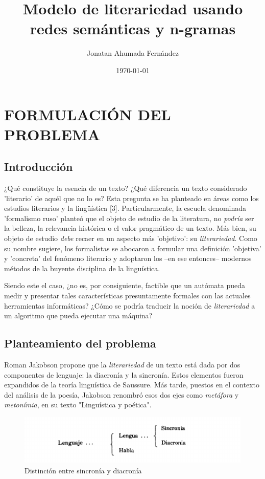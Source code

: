 \documentclass[twoside]{article}
\author{Jonatan Ahumada Fernández}
\date{\today}
\title{Modelo de literariedad usando redes semánticas y n-gramas}
\begin{document}
\maketitle
\tableofcontents

\section{FORMULACIÓN DEL PROBLEMA}
\label{sec:org73fd18f}
\subsection{Introducción}
\label{sec:org29c4680}

¿Qué constituye la esencia de un texto? ¿Qué diferencia un texto
considerado 'literario' de aquél que no lo es? Esta pregunta se ha
planteado en áreas como los estudios literarios y la lingüística
[3]. Particularmente, la escuela denominada 'formalismo ruso' planteó
que el objeto de estudio de la literatura, no \emph{podría} ser la belleza, la
relevancia histórica o el valor pragmático de un texto. Más
bien, su objeto de estudio \emph{debe} recaer en un aspecto más 'objetivo':
su \emph{literariedad}.  Como su nombre sugiere, los formalistas se
abocaron a formular una definición 'objetiva' y 'concreta' del
fenómeno literario y adoptaron los --en ese entonces-- modernos
métodos de la buyente disciplina de la linguística.

Siendo este el caso, ¿no es, por consiguiente, factible que un
autómata pueda medir y presentar tales características presuntamente
formales con las actuales herramientas informáticas? ¿Cómo se podría
traducir la noción de \emph{literariedad} a un algoritmo que pueda ejecutar
una máquina?


\subsection{Planteamiento del problema}
\label{sec:org25a0a33}
Roman Jakobson propone que la \emph{literariedad} de un texto está dada por
dos componentes de lenguaje: la diacronía y la sincronía. Estos
elementos fueron expandidos de la teoría linguística de Saussure.
Más tarde, puestos en el contexto del análisis de la poesía,
Jakobson renombró esos dos ejes como \emph{metáfora} y \emph{metonímia}, en su texto
"Linguística y poética". 



\begin{figure}[htbp]
\centering
\includegraphics[width=.9\linewidth]{./assets/clasificacion_saussure.png}
\caption{Distinción entre sincronía y diacronía}
\end{figure}
\end{document}

